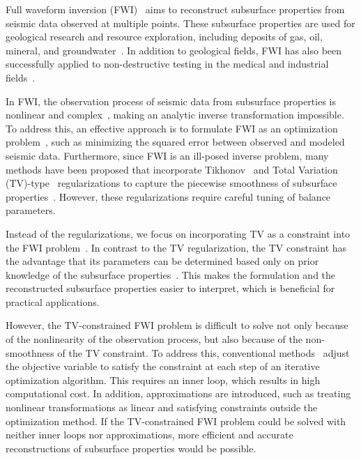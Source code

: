 Full waveform inversion (FWI)~\cite{FWI0,FWI1} aims to reconstruct subsurface properties from seismic data observed at multiple points.
These subsurface properties are used for geological research and resource exploration, including deposits of gas, oil, mineral, and groundwater~\cite{FWI1,FWIApplicationGroundwater0,FWIApplicationGroundwater1}.
In addition to geological fields, FWI has also been successfully applied to non-destructive testing in the medical and industrial fields~\cite{FWIApplicationNonDestructiveTesting0,FWIApplicationNonDestructiveTesting1}.

In FWI, the observation process of seismic data from subsurface properties is nonlinear and complex~\cite{FWI1}, making an analytic inverse transformation impossible.
To address this, an effective approach is to formulate FWI as an optimization problem~\cite{FWI0,CustomFWI0,CustomFWI1,CustomFWI2,CustomFWI3,CustomFWI4,CustomFWI5}, such as minimizing the squared error between observed and modeled seismic data.
Furthermore, since FWI is an ill-posed inverse problem, many methods have been proposed that incorporate Tikhonov~\cite{tikhonov} and Total Variation (TV)-type~\cite{TV,TGV} regularizations to capture the piecewise smoothness of subsurface properties~\cite{FWI-with-tikhonov-regularization,FWI-with-TV-regularization,FWI-with-directional-TV-regularization,FWI-with-high-order-TV-regularization,FWI-with-TGV-regularization}.
However, these regularizations require careful tuning of balance parameters.

Instead of the regularizations, we focus on incorporating TV as a constraint into the FWI problem~\cite{FWI-with-TV-constraint,FWI-with-TV-constraint2,FWI-with-TV-constraint3}.
In contrast to the TV regularization, the TV constraint has the advantage that its parameters can be determined based only on prior knowledge of the subsurface properties~\cite{constraints-vs-penalties-in-FWI}.
This makes the formulation and the reconstructed subsurface properties easier to interpret, which is beneficial for practical applications.

However, the TV-constrained FWI problem is difficult to solve not only because of the nonlinearity of the observation process, but also because of the non-smoothness of the TV constraint.
To address this, conventional methods~\cite{FWI-with-TV-constraint,FWI-with-TV-constraint2,FWI-with-TV-constraint3} adjust the objective variable to satisfy the constraint at each step of an iterative optimization algorithm.
This requires an inner loop, which results in high computational cost.
In addition, approximations are introduced, such as treating nonlinear transformations as linear and satisfying constraints outside the optimization method.
If the TV-constrained FWI problem could be solved with neither inner loops nor approximations, more efficient and accurate reconstructions of subsurface properties would be possible.

